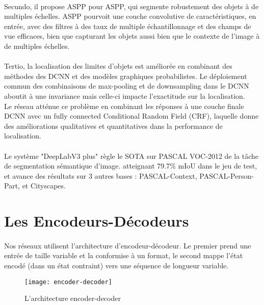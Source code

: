 \documentclass[
10pt, %
a4paper, %
oneside, %
headinclude,footinclude, %
]{scrartcl}
\begin{document}
\paragraph{}Secundo, il propose ASPP pour \gls{ASPP}, qui segmente robustement des objets à de multiples échelles. ASPP pourvoit une couche convolutive de caractéristiques, en entrée, avec des filtres à des taux de multiple échantillonnage et des champs de vue efficaces, bien que capturant les objets aussi bien que le contexte de l’image à de multiples échelles.

\paragraph{}Tertio, la localisation des limites d’objets est améliorée en combinant des méthodes des DCNN et des modèles graphiques probabilistes. Le déploiement commun des combinaisons de max-pooling et de downsampling dans le DCNN aboutit à une invariance mais celle-ci impacte l’exactitude sur la localisation.
\\
Le réseau atténue ce problème en combinant les réponses à une couche finale DCNN avec un fully connected Conditional Random Field (CRF), laquelle donne des améliorations qualitatives et quantitatives dans la performance de localisation.

\paragraph{}Le système "DeepLabV3 plus" règle le SOTA sur PASCAL VOC-2012 de la tâche de segmentation sémantique d’image. atteignant 79.7\% mIoU dans le jeu de test, et avance des résultats  sur 3 autres bases : PASCAL-Context, PASCAL-Person-Part, et Cityscapes.
\section{Les Encodeurs-Décodeurs}
\paragraph{}Nos réseaux utilisent l’architecture d’encodeur-décodeur\cite{zhang2020dive}. Le premier prend une entrée de taille variable et la conformise à un format, le second mappe l’état encodé (dans un état contraint) vers une séquence de longueur variable.

\begin{figure}[htb]
\centering 
\texttt{[image: encoder-decoder]} 
\caption[L’architecture encoder-decoder]{L’architecture encoder-decoder} %
\label{fig:data_augmentation} 
\end{figure}
\end{document}
